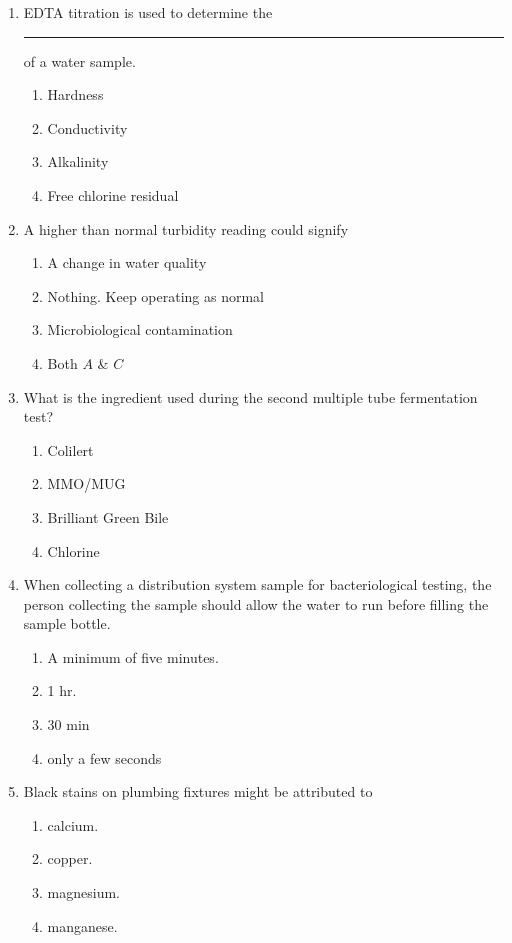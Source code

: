 \documentclass{article}
\begin{document}
\begin{enumerate}[1.]
\item EDTA titration is used to determine the \rule{2cm}{0.3pt} of a water sample.
\begin{enumerate}
\item Hardness
\item Conductivity
\item Alkalinity
\item Free chlorine residual
\end{enumerate}

\item  A higher than normal turbidity reading could signify\\
\begin{enumerate}
\item A change in water quality\\
\item Nothing. Keep operating as normal\\
\item Microbiological contamination\\
\item Both $A$ \& $C$
\end{enumerate}

\item  What is the ingredient used during the second multiple tube fermentation test?\\
\begin{enumerate}
\item Colilert\\
\item MMO/MUG\\
\item Brilliant Green Bile\\
\item Chlorine
\end{enumerate}

\item When collecting a distribution system sample for bacteriological testing, the person collecting the sample should allow the water to run before filling the sample bottle.
\begin{enumerate}
\item A minimum of five minutes.
\item 1 hr.
\item 30 min
\item only a few seconds
\end{enumerate}

\item Black stains on plumbing fixtures might be attributed to
\begin{enumerate}
\item calcium.
\item copper.
\item magnesium.
\item manganese.
\end{enumerate}


\end{enumerate}
\end{document}
